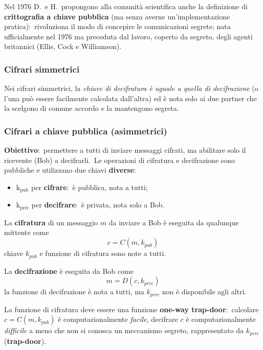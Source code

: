 Nel 1976 D.\ e H.\ propongono alla comunità scientifica anche la definizione di \textbf{crittografia a chiave pubblica} (ma senza averne un'implementazione pratica):\ rivoluziona il modo di concepire le comunicazioni segrete; nata ufficialmente nel 1976 ma preceduta dal lavoro, coperto da segreto, degli agenti britannici (Ellis, Cock e Williamson).\

\subsubsection{Cifrari simmetrici}

Nei cifrari simmetrici, la \textit{chiave di decifratura è uguale a quella di decifrazione} (o l'una può essere facilmente calcolata dall'altra) ed è nota solo ai due partner che la scelgono di comune accordo e la mantengono segreta.\

\subsubsection{Cifrari a chiave pubblica (asimmetrici)}

\textbf{Obiettivo}:\ permettere a tutti di inviare messaggi cifrati, ma abilitare solo il ricevente (Bob) a decifrarli.\
Le operazioni di cifratura e decifrazione sono pubbliche e utilizzano due chiavi \textbf{diverse}:

\begin{itemize}
    \item $\mathrm{k_{pub}}$ per \textbf{cifrare}:\ è pubblica, nota a tutti;
    \item $\mathrm{k_{priv}}$ per \textbf{decifrare}:\ è privata, nota solo a Bob.\
\end{itemize}

\noindent La \textbf{cifratura} di un messaggio $m$ da inviare a Bob è eseguita da qualunque mittente come \[c = C(m,k_{pub})\] chiave $k_{pub}$ e funzione di cifratura sono note a tutti.\

\vspace{12pt}

\noindent La \textbf{decifrazione} è eseguita da Bob come \[m= D(c, k_{priv})\] la funzione di decifrazione è nota a tutti, ma $k_{priv}$ non è disponibile agli altri.\

\vspace{12pt}

\noindent La funzione di cifratura deve essere una funzione \textbf{one-way trap-door}:\ calcolare $c = C(m, k_{pub})$ è computazionalmente \textit{facile}, decifrare $c$ è computazionalmente \textit{difficile} a meno che non si conosca un meccanismo segreto, rappresentato da $k_{priv}$ (\textbf{trap-door}).\

